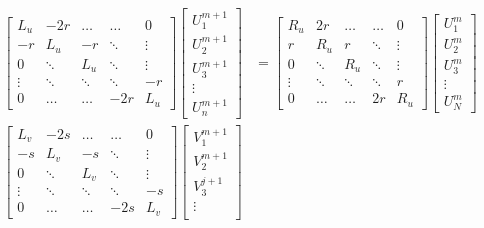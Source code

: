 \begin{align*}
\begin{bmatrix}
    L_u    & -2r    & \dots  & \dots  & 0 \\
    -r     & L_u    & -r     & \ddots & \vdots \\
    0      & \ddots & L_u    & \ddots & \vdots \\
    \vdots & \ddots & \ddots & \ddots & -r   \\
    0      & \dots  & \dots  & -2r    & L_u
\end{bmatrix}
\begin{bmatrix}
    U_1^{m+1}     \\
    U_2^{m+1}     \\
    U_3^{m+1}     \\
    \vdots        \\
    U_n^{m+1}
\end{bmatrix}
&=
\begin{bmatrix}
    R_u    & 2r     & \dots  & \dots  & 0      \\
    r      & R_u    & r      & \ddots & \vdots \\
    0      & \ddots & R_u    & \ddots & \vdots \\
    \vdots & \ddots & \ddots & \ddots & r      \\
    0      & \dots  & \dots  & 2r     & R_u
\end{bmatrix}
\begin{bmatrix}
    U_1^{m} \\
    U_2^{m} \\
    U_3^{m} \\
    \vdots  \\
    U_N^{m}
\end{bmatrix} \\[10pt]
\begin{bmatrix}
    L_v   & -2s     & \dots  & \dots  & 0       \\
    -s     & L_v    & -s     & \ddots & \vdots  \\
    0      & \ddots & L_v    & \ddots & \vdots  \\
    \vdots & \ddots & \ddots & \ddots & -s      \\
    0      & \dots  & \dots  & -2s    & L_v
\end{bmatrix}
\begin{bmatrix}
    V_1^{m+1}     \\
    V_2^{m+1}     \\
    V_3^{j+1}     \\
    \vdots        \\

\end{bmatrix}
\end{align*}
